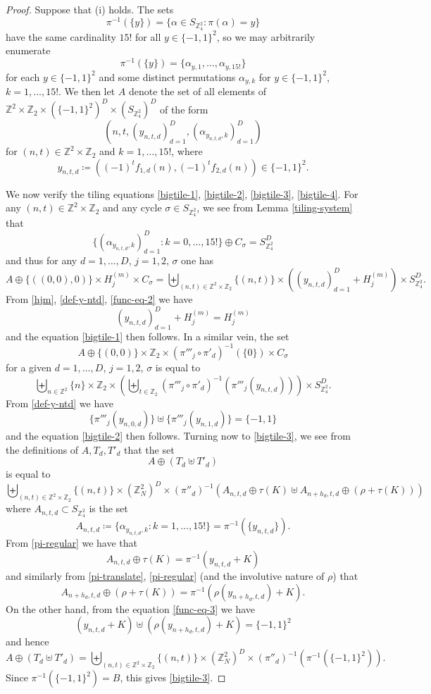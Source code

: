 \documentclass[reqno,a4paper,12pt]{amsart}
\numberwithin{equation}{section}
\numberwithin{figure}{section}
\def\Z{\mathbb{Z}}
\theoremstyle{plain}
\theoremstyle{definition}
\begin{document}
\begin{proof} Suppose that (i) holds.  The sets 
$$ 
\pi^{-1}(\{y\}) = \{ \alpha \in S_{\Z_4^2}: \pi(\alpha) = y \} $$
 have the same cardinality $15!$ for all $y \in \{-1,1\}^2$, so we may arbitrarily enumerate
$$ 
 \pi^{-1}(\{y\}) =\{ \alpha_{y,1},\dots,\alpha_{y,15!} \}$$
for each $y \in \{-1,1\}^2$ and some distinct permutations $\alpha_{y,k}$ for $y \in \{-1,1\}^2$, $k=1,\dots,15!$.  We then let $A$ denote the set of all elements of $\Z^2 \times \Z_2 \times (\{-1,1\}^2)^D\times (S_{\Z_4^2})^D$ of the form
$$ (n, t, (y_{n,t,d})_{d=1}^D, (\alpha_{y_{n,t,d},k})_{d=1}^{D} )$$
for $(n,t) \in \Z^2 \times \Z_2$ and $k=1,\dots,15!$, where
\begin{equation}\label{def-y-ntd}
    y_{n,t,d} \coloneqq ((-1)^t f_{1,d}(n), (-1)^t f_{2,d}(n)) \in \{-1,1\}^2.
\end{equation} 

We now verify the tiling equations \eqref{bigtile-1}, \eqref{bigtile-2}, \eqref{bigtile-3}, \eqref{bigtile-4}.  For any $(n,t) \in \Z^2 \times \Z_2$ and any cycle $\sigma \in S_{\Z_4^2}$, we see from Lemma \ref{tiling-system} that
$$ \{ (\alpha_{y_{n,t,d},k})_{d=1}^{D}: k=0,\dots,15!\} \oplus C_\sigma = S_{\Z_4^2}^{D}$$
and thus for any $d=1,\dots,D$, $j=1,2$, $\sigma$ one has
$$ A \oplus \{((0,0),0)\} \times H_j^{(m)} \times C_\sigma
= \biguplus_{(n,t) \in \Z^2 \times \Z_2}
\{(n,t)\} \times ((y_{n,t,d})_{d=1}^D + H_j^{(m)}) \times S_{\Z_4^2}^{D}.$$
From \eqref{hjm}, \eqref{def-y-ntd}, \eqref{func-eq-2} we have
$$ (y_{n,t,d})_{d=1}^D + H_j^{(m)} = H_j^{(m)}$$
and the equation \eqref{bigtile-1} then follows.  In a similar vein, the set
$$ A \oplus \{(0,0)\} \times \Z_2 \times (\pi'''_j \circ \pi'_d)^{-1}(\{0\}) \times C_\sigma $$
for a given $d=1,\dots,D$, $j=1,2$, $\sigma$ is equal to
$$ \biguplus_{n \in \Z^2}
\{n\} \times \Z_2 \times 
\left( \biguplus_{t \in \Z_2} (\pi'''_j \circ \pi'_d)^{-1}(\pi'''_j(y_{n,t,d}))\right) \times S_{\Z_4^2}^{D}.$$
From \eqref{def-y-ntd} we have
$$\{ \pi'''_j(y_{n,0,d})\} \uplus \{ \pi'''_j(y_{n,1,d}) \} = \{-1,1\}$$
and the equation \eqref{bigtile-2} then follows.  Turning now to \eqref{bigtile-3}, we see from the definitions of $A, T_d, T'_d$ that the set
$$ A \oplus (T_d \uplus T'_d)$$
is equal to
$$ \biguplus_{(n,t) \in \Z^2 \times \Z_2} \{(n,t)\} \times (\Z_N^2)^D \times
(\pi''_d)^{-1}\left( A_{n,t,d} \oplus \tau(K) \uplus A_{n+h_d,t,d} \oplus (\rho + \tau(K)) \right)$$
where $A_{n,t,d} \subset S_{\Z_4^2}$ is the set
$$ A_{n,t,d} \coloneqq \{ \alpha_{y_{n,t,d},k}: k=1,\dots,15!\} = \pi^{-1}(\{ y_{n,t,d}\}).$$
From \eqref{pi-regular} we have that
$$A_{n,t,d} \oplus \tau(K) = \pi^{-1}(y_{n,t,d} + K)$$
and similarly from \eqref{pi-translate}, \eqref{pi-regular}  (and the involutive nature of $\rho$) that
$$A_{n+h_d,t,d} \oplus (\rho + \tau(K)) = \pi^{-1}( \rho(y_{n+h_d,t,d}) + K ).$$
On the other hand, from the equation \eqref{func-eq-3} we have
$$ (y_{n,t,d} + K) \uplus (\rho(y_{n+h_d,t,d}) + K) = \{-1,1\}^2$$
and hence
$$ A \oplus (T_d \uplus T'_d) = \biguplus_{(n,t) \in \Z^2 \times \Z_2} \{(n,t)\} \times (\Z_N^2)^D \times
(\pi''_d)^{-1}\left( \pi^{-1}(\{-1,1\}^2) \right).$$
Since $\pi^{-1}(\{-1,1\}^2) = B$, this gives \eqref{bigtile-3}.


\end{proof}
\end{document}

